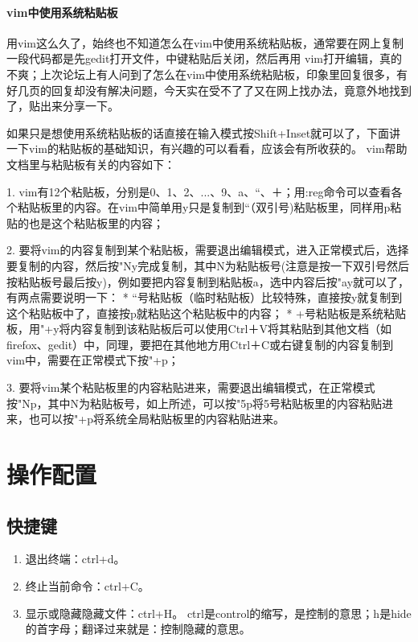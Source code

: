 {\subsubsection{vim中使用系统粘贴板}
用vim这么久了，始终也不知道怎么在vim中使用系统粘贴板，通常要在网上复制一段代码都是先gedit打开文件，中键粘贴后关闭，然后再用 vim打开编辑，真的不爽；上次论坛上有人问到了怎么在vim中使用系统粘贴板，印象里回复很多，有好几页的回复却没有解决问题，今天实在受不了了又在网上找办法，竟意外地找到了，贴出来分享一下。 

如果只是想使用系统粘贴板的话直接在输入模式按Shift+Inset就可以了，下面讲一下vim的粘贴板的基础知识，有兴趣的可以看看，应该会有所收获的。 
vim帮助文档里与粘贴板有关的内容如下： 

1. vim有12个粘贴板，分别是0、1、2、...、9、a、“、＋；用:reg命令可以查看各个粘贴板里的内容。在vim中简单用y只是复制到“（双引号)粘贴板里，同样用p粘贴的也是这个粘贴板里的内容； 

2. 要将vim的内容复制到某个粘贴板，需要退出编辑模式，进入正常模式后，选择要复制的内容，然后按"Ny完成复制，其中N为粘贴板号(注意是按一下双引号然后按粘贴板号最后按y)，例如要把内容复制到粘贴板a，选中内容后按"ay就可以了，有两点需要说明一下： 
* “号粘贴板（临时粘贴板）比较特殊，直接按y就复制到这个粘贴板中了，直接按p就粘贴这个粘贴板中的内容； 
* +号粘贴板是系统粘贴板，用"+y将内容复制到该粘贴板后可以使用Ctrl＋V将其粘贴到其他文档（如firefox、gedit）中，同理，要把在其他地方用Ctrl＋C或右键复制的内容复制到vim中，需要在正常模式下按"+p； 

3. 要将vim某个粘贴板里的内容粘贴进来，需要退出编辑模式，在正常模式按"Np，其中N为粘贴板号，如上所述，可以按"5p将5号粘贴板里的内容粘贴进来，也可以按"+p将系统全局粘贴板里的内容粘贴进来。 




\chapter{操作配置}
\section{快捷键}
\begin{enumerate}
\item 退出终端：ctrl+d。

\item 终止当前命令：ctrl+C。

\item 显示或隐藏隐藏文件：ctrl+H。 ctrl是control的缩写，是控制的意思；h是hide的首字母；翻译过来就是：控制隐藏的意思。


\end{enumerate}}
